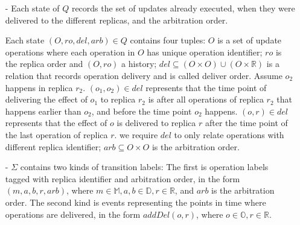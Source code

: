 \begin{itemize}
\setlength{\itemsep}{0.5pt}
\item[-] Each state of $Q$ records the set of updates already executed, when they were delivered to the different replicas, and the arbitration order.

    Each state $(O,\mathit{ro},\mathit{del},\mathit{arb}) \in Q$ contains four tuples: $O$ is a set of update operations where each operation in $O$ has unique operation identifier; $\mathit{ro}$ is the replica order and $(O,\mathit{ro})$ a history; $\mathit{del} \subseteq (O \times O) \cup (O \times \mathbb{R})$ is a relation that records operation delivery and is called deliver order. {\color {red}Assume $o_2$ happens in replica $r_2$. $(o_1,o_2) \in \mathit{del}$ represents that the time point of delivering the effect of $o_1$ to replica $r_2$ is after all operations of replica $r_2$ that happens earlier than $o_2$, and before the time point  $o_2$ happens}. $(o,r) \in \mathit{del}$ represents that the effect of $o$ is delivered to replica $r$ after the time point of the last operation of replica $r$. we require $\mathit{del}$ to only relate operations with different replica identifier; $\mathit{arb} \subseteq O \times O$ is the arbitration order.




\item[-] $\Sigma$ contains two kinds of transition labels: The first is operation labels tagged with replica identifier and arbitration order, in the form $(m,a,b,r,\mathit{arb})$, where $m \in \mathbb{M}, a,b \in \mathbb{D}, r \in \mathbb{R}$, and $\mathit{arb}$ is the arbitration order. The second kind is events representing the points in time where operations are delivered, in the form $addDel(o,r)$, where $o \in \mathbb{O}, r \in \mathbb{R}$.


\end{itemize}
